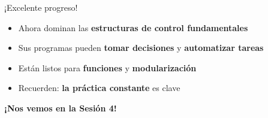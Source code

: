\documentclass[10pt]{beamer}
\begin{document}
\begin{frame}
  \huge{\centerline{¡Excelente progreso!}}
  \vspace{0.5cm}
  \normalsize
  \begin{itemize}
    \item Ahora dominan las \textbf{estructuras de control fundamentales}
    \item Sus programas pueden \textbf{tomar decisiones} y \textbf{automatizar tareas}
    \item Están listos para \textbf{funciones} y \textbf{modularización}
    \item Recuerden: \textbf{la práctica constante} es clave
  \end{itemize}
  
  \begin{center}
    \textbf{¡Nos vemos en la Sesión 4!}
  \end{center}
\end{frame}
\end{document}
